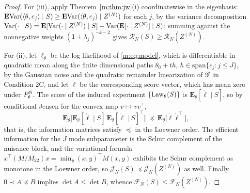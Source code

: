 \begin{proof}
For (iii), apply Theorem~\ref{m:thm:jw}(i) coordinatewise in the eigenbasis: $\mathbf{E}\mathrm{Var}(\langle\theta,e_j\rangle\mid S)\ge\mathbf{E}\mathrm{Var}(\langle\theta,e_j\rangle\mid Z^{(N)})$ for each $j$, by the variance decomposition $\mathrm{Var}(\cdot\mid S)=\mathbf{E}[\mathrm{Var}(\cdot\mid Z^{(N)})\mid S]+\mathrm{Var}(\mathbf{E}[\cdot\mid Z^{(N)}]\mid S)$; summing against the nonnegative weights $(1+\lambda_j)^{-k-2}$ gives $\mathcal R_N(S)\ge\mathcal R_N(Z^{(N)})$.

For (ii), let $\ell_\theta$ be the log likelihood of \eqref{m:eq:model}, which is differentiable in quadratic mean along the finite dimensional paths $\theta_0+th$, $h\in\mathrm{span}\{e_j:j\le J\}$, by the Gaussian noise and the quadratic remainder linearization of $\mathscr{G}$ in Condition 2C, and let $\dot\ell$ be the corresponding score vector, which has mean zero under $P^{\mathbb{N}}_\theta$. The score of the induced experiment $\{\operatorname{Law}_\theta(S)\}$ is $\mathbf{E}_\theta[\dot\ell\mid S]$, so by conditional Jensen for the convex map $v\mapsto vv^\top$,
\[
\mathbf{E}_\theta\Big[\mathbf{E}_\theta[\dot\ell\mid S]\,\mathbf{E}_\theta[\dot\ell\mid S]^\top\Big]\ \preceq\ \mathbf{E}_\theta\big[\dot\ell\dot\ell^\top\big] ,
\]
that is, the information matrices satisfy $\preceq$ in the Loewner order. The efficient information for the $J$ mode subparameter is the Schur complement of the nuisance block, and the variational formula $x^\top(M/M_{22})x=\min_y(x,y)^\top M(x,y)$ exhibits the Schur complement as monotone in the Loewner order, so $\mathcal J_N(S)\preceq\mathcal J_N(Z^{(N)})$ as well. Finally $0\prec A\preceq B$ implies $\det A\le\det B$, whence $\mathcal F_N(S)\le\mathcal F_N(Z^{(N)})$.


\end{proof}
